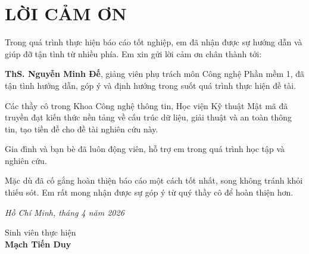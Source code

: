 
\chapter*{LỜI CẢM ƠN}


Trong quá trình thực hiện báo cáo tốt nghiệp, em đã nhận được sự hướng dẫn và giúp đỡ tận tình từ nhiều phía. Em xin gửi lời cảm ơn chân thành tới:

\textbf{ThS. Nguyễn Minh Đế}, giảng viên phụ trách môn Công nghệ Phần mềm 1, đã tận tình hướng dẫn, góp ý và định hướng trong suốt quá trình thực hiện đề tài.

Các thầy cô trong Khoa Công nghệ thông tin, Học viện Kỹ thuật Mật mã đã truyền đạt kiến thức nền tảng về cấu trúc dữ liệu, giải thuật và an toàn thông tin, tạo tiền đề cho đề tài nghiên cứu này.

Gia đình và bạn bè đã luôn động viên, hỗ trợ em trong quá trình học tập và nghiên cứu.

Mặc dù đã cố gắng hoàn thiện báo cáo một cách tốt nhất, song không tránh khỏi thiếu sót. Em rất mong nhận được sự góp ý từ quý thầy cô để hoàn thiện hơn.

\vspace{1cm}
\hfill\begin{minipage}{0.45\textwidth}
\raggedright\itshape Hồ Chí Minh, tháng 4 năm 2026\par
\vspace{12pt}
\centering\upshape
Sinh viên thực hiện\\[24pt]
\textbf{Mạch Tiến Duy}
\end{minipage}
